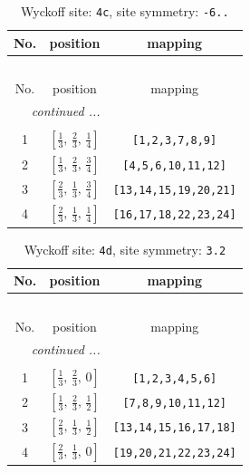 \documentclass[fleqn,8pt]{jsarticle}
\begin{document}
\renewcommand{\arraystretch}{1.2}
\begin{longtable}{ccc}
\caption{Wyckoff site: {\tt 4c}, site symmetry: {\tt -6..}}
 \\
 \hline \hline
No. & position & mapping \\ \hline \endfirsthead

\multicolumn{2}{l}{\tablename\ \thetable{}} \\
 \hline \hline
No. & position & mapping \\ \hline \endhead

 \hline \hline
\multicolumn{2}{r}{\footnotesize\it continued ...} \\ \endfoot

 \hline \hline
\multicolumn{2}{r}{} \\ \endlastfoot

1 & $\left[ \frac{1}{3},\, \frac{2}{3},\, \frac{1}{4} \right]$ & {\tt [1,2,3,7,8,9]} \\ \hline
2 & $\left[ \frac{1}{3},\, \frac{2}{3},\, \frac{3}{4} \right]$ & {\tt [4,5,6,10,11,12]} \\ \hline
3 & $\left[ \frac{2}{3},\, \frac{1}{3},\, \frac{3}{4} \right]$ & {\tt [13,14,15,19,20,21]} \\ \hline
4 & $\left[ \frac{2}{3},\, \frac{1}{3},\, \frac{1}{4} \right]$ & {\tt [16,17,18,22,23,24]} \\
\end{longtable}
\renewcommand{\arraystretch}{1.2}
\begin{longtable}{ccc}
\caption{Wyckoff site: {\tt 4d}, site symmetry: {\tt 3.2}}
 \\
 \hline \hline
No. & position & mapping \\ \hline \endfirsthead

\multicolumn{2}{l}{\tablename\ \thetable{}} \\
 \hline \hline
No. & position & mapping \\ \hline \endhead

 \hline \hline
\multicolumn{2}{r}{\footnotesize\it continued ...} \\ \endfoot

 \hline \hline
\multicolumn{2}{r}{} \\ \endlastfoot

1 & $\left[ \frac{1}{3},\, \frac{2}{3},\, 0 \right]$ & {\tt [1,2,3,4,5,6]} \\ \hline
2 & $\left[ \frac{1}{3},\, \frac{2}{3},\, \frac{1}{2} \right]$ & {\tt [7,8,9,10,11,12]} \\ \hline
3 & $\left[ \frac{2}{3},\, \frac{1}{3},\, \frac{1}{2} \right]$ & {\tt [13,14,15,16,17,18]} \\ \hline
4 & $\left[ \frac{2}{3},\, \frac{1}{3},\, 0 \right]$ & {\tt [19,20,21,22,23,24]} \\
\end{longtable}
\end{document}
